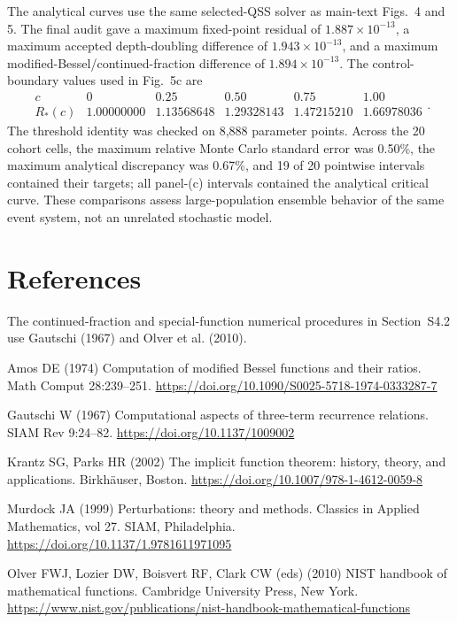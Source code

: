 \documentclass[9pt,a4paper]{article}
\begin{document}
The analytical curves use the same selected-QSS solver as main-text Figs.~4 and 5. The final audit gave a maximum fixed-point residual of $1.887\times10^{-13}$, a maximum accepted depth-doubling difference of $1.943\times10^{-13}$, and a maximum modified-Bessel/continued-fraction difference of $1.894\times10^{-13}$. The control-boundary values used in Fig.~5c are
\begin{equation}
\begin{array}{c|ccccc}
c & 0 & 0.25 & 0.50 & 0.75 & 1.00\\ \hline
R_*(c) & 1.00000000 & 1.13568648 & 1.29328143 & 1.47215210 & 1.66978036
\end{array}.
\label{eq:S8-critical-values}
\end{equation}
The threshold identity was checked on 8,888 parameter points. Across the 20 cohort cells, the maximum relative Monte Carlo standard error was 0.50\%, the maximum analytical discrepancy was 0.67\%, and 19 of 20 pointwise intervals contained their targets; all panel-(c) intervals contained the analytical critical curve. These comparisons assess large-population ensemble behavior of the same event system, not an unrelated stochastic model.

\section*{References}

The continued-fraction and special-function numerical procedures in Section~S4.2 use Gautschi (1967) and Olver et al. (2010).

\begin{list}{}{\setlength{\leftmargin}{1.2em}\setlength{\itemindent}{-1.2em}\setlength{\itemsep}{0.4em}}
\item Amos DE (1974) Computation of modified Bessel functions and their ratios. Math Comput 28:239--251. \url{https://doi.org/10.1090/S0025-5718-1974-0333287-7}
\item Gautschi W (1967) Computational aspects of three-term recurrence relations. SIAM Rev 9:24--82. \url{https://doi.org/10.1137/1009002}
\item Krantz SG, Parks HR (2002) The implicit function theorem: history, theory, and applications. Birkhäuser, Boston. \url{https://doi.org/10.1007/978-1-4612-0059-8}
\item Murdock JA (1999) Perturbations: theory and methods. Classics in Applied Mathematics, vol 27. SIAM, Philadelphia. \url{https://doi.org/10.1137/1.9781611971095}
\item Olver FWJ, Lozier DW, Boisvert RF, Clark CW (eds) (2010) NIST handbook of mathematical functions. Cambridge University Press, New York. \url{https://www.nist.gov/publications/nist-handbook-mathematical-functions}
\end{list}
\end{document}
